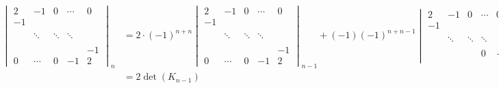 \begin{align}
	\begin{vmatrix}
		2  & -1      &  0     & \cdots  & 0\\
		-1 &         &        &         &   \\
		   &         &        &         &   \\
		   & \ddots  & \ddots & \ddots  &   \\
		   &         &        &         &   \\
		   &         &        &         & -1\\
		0  & \cdots  &  0     &   -1    & 2
	\end{vmatrix}_n
	&=
	2\cdot(-1)^{n + n}
	\begin{vmatrix}
		2  & -1      &  0     & \cdots  & 0\\
		-1 &         &        &         &   \\
		   &         &        &         &   \\
		   & \ddots  & \ddots & \ddots  &   \\
		   &         &        &         &   \\
		   &         &        &         & -1\\
		0  & \cdots  &  0     &   -1    & 2
	\end{vmatrix}_{n-1}
	+
	(-1)(-1)^{n+n-1}
	\begin{vmatrix}
		2  & -1      &  0     & \cdots  & 0\\
		-1 &         &        &         &   \\
		   &         &        &         &   \\
		   & \ddots  & \ddots & \ddots  &   \\
		   &         &        &         &   \\
		   &         &        &       0 & -1\\
	\end{vmatrix}_{n-1}\\
	&= 2\det (K_{n-1})
\end{align}
